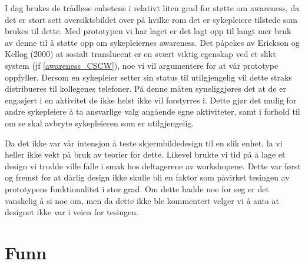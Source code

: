 \noindent
I dag brukes de trådløse enhetene i relativt liten grad for støtte om awareness, da det er stort sett oversiktsbildet over på hvilke rom det er sykepleiere tilstede som brukes til dette. Med prototypen vi har laget er det lagt opp til langt mer bruk av denne til å støtte opp om sykepleiernes awareness. Det påpekes av Erickson og Kellog (2000) at sosialt translucent er en svært viktig egenskap ved et slikt system (jf \ref{awareness_CSCW}), noe vi vil argumentere for at vår prototype oppfyller.  Dersom en sykepleier setter sin status til utilgjengelig vil dette straks distribueres til kollegenes telefoner. På denne måten syneliggjøres det at de er engasjert i en aktivitet de ikke helst ikke vil forstyrres i. Dette gjør det mulig for andre sykepleiere å ta ansvarlige valg angående egne aktiviteter, samt i forhold til om se skal avbryte sykepleieren som er utilgjengelig. 

\noindent
Da det ikke var vår intensjon å teste skjermbildedesign til en slik enhet, la vi heller ikke vekt på bruk av teorier for dette. Likevel brukte vi tid på å lage et design vi trodde ville falle i smak hos deltagerene av workshopene. Dette var først og fremst for at dårlig design ikke skulle bli en faktor som påvirket tesingen av prototypens funktionalitet i stor grad. Om dette hadde noe for seg er det vanskelig å si noe om, men da dette ikke ble kommentert velger vi å anta at designet ikke var i veien for tesingen.

\section{Funn}


